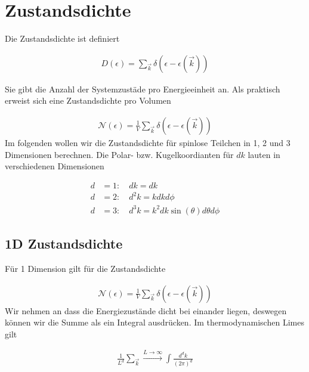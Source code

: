 
\usepackage{amsmath} 





\section*{Zustandsdichte}

Die Zustandsdichte ist definiert 

\begin{align}
  \label{eq:1}
  \boxed{ D(\epsilon) = \sum_{\vec k} \delta(\epsilon - \epsilon(\vec k)) }
\end{align}

Sie gibt die Anzahl der Systemzustäde pro Energieeinheit an. Als praktisch erweist sich eine Zustandsdichte pro Volumen

\begin{align}
  \label{eq:2}
  \mathcal N(\epsilon) = \frac{1}{V} \sum_{\vec k} \delta(\epsilon - \epsilon(\vec k))
\end{align}
Im folgenden wollen wir die Zustandsdichte für spinlose Teilchen in 1, 2 und 3 Dimensionen berechnen. Die Polar- bzw. Kugelkoordianten für \(dk\) lauten in verschiedenen Dimensionen

\begin{align}
  d&=1:\quad dk = dk \label{eq:10.1} \\
  d&=2:\quad d^2k = kdkd\phi \label{eq:10.2}\\
  d&=3:\quad d^3k = k^2dk \sin(\theta)d\theta d\phi \label{eq:10.3}
\end{align}

\subsection*{1D Zustandsdichte}

Für 1 Dimension gilt für die Zustandsdichte

\begin{align}
  \label{eq:3}
  \mathcal N(\epsilon) = \frac{1}{V} \sum_{\vec k} \delta(\epsilon - \epsilon(\vec k))
\end{align}
Wir nehmen an dass die Energiezustände dicht bei einander liegen, deswegen können wir die Summe als ein Integral ausdrücken. Im thermodynamischen Limes gilt

\begin{align}
  \label{eq:4}
\boxed{  \frac{1}{L^d}\sum_{\vec k} \xrightarrow{L\to \infty} \int \frac{d^d k}{(2\pi)^d} }
\end{align}

